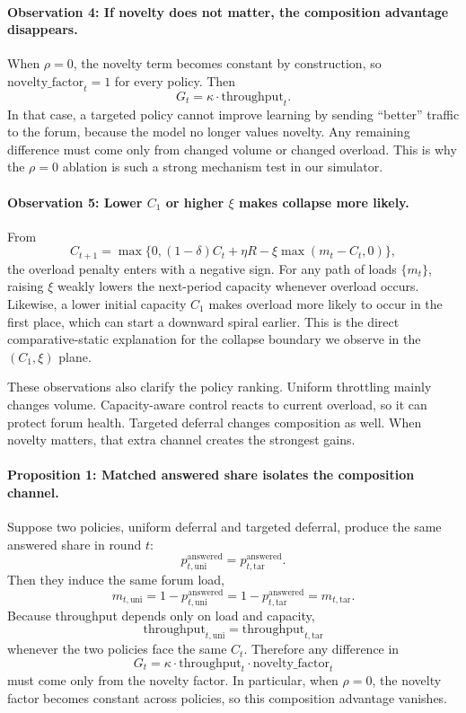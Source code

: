 \documentclass{article}
\begin{document}
\paragraph{Observation 4: If novelty does not matter, the composition advantage disappears.}
When $\rho=0$, the novelty term becomes constant by construction, so $\text{novelty\_factor}_t=1$ for every policy. Then
\[
G_t = \kappa \cdot \text{throughput}_t.
\]
In that case, a targeted policy cannot improve learning by sending ``better'' traffic to the forum, because the model no longer values novelty. Any remaining difference must come only from changed volume or changed overload. This is why the $\rho=0$ ablation is such a strong mechanism test in our simulator.

\paragraph{Observation 5: Lower $C_1$ or higher $\xi$ makes collapse more likely.}
From
\[
C_{t+1} = \max\{0,(1-\delta)C_t + \eta R - \xi \max(m_t-C_t,0)\},
\]
the overload penalty enters with a negative sign. For any path of loads $\{m_t\}$, raising $\xi$ weakly lowers the next-period capacity whenever overload occurs. Likewise, a lower initial capacity $C_1$ makes overload more likely to occur in the first place, which can start a downward spiral earlier. This is the direct comparative-static explanation for the collapse boundary we observe in the $(C_1,\xi)$ plane.

These observations also clarify the policy ranking. Uniform throttling mainly changes volume. Capacity-aware control reacts to current overload, so it can protect forum health. Targeted deferral changes composition as well. When novelty matters, that extra channel creates the strongest gains.

\paragraph{Proposition 1: Matched answered share isolates the composition channel.}
Suppose two policies, uniform deferral and targeted deferral, produce the same answered share in round $t$:
\[
p^{\mathrm{answered}}_{t,\mathrm{uni}} = p^{\mathrm{answered}}_{t,\mathrm{tar}}.
\]
Then they induce the same forum load,
\[
m_{t,\mathrm{uni}} = 1 - p^{\mathrm{answered}}_{t,\mathrm{uni}}
= 1 - p^{\mathrm{answered}}_{t,\mathrm{tar}}
= m_{t,\mathrm{tar}}.
\]
Because throughput depends only on load and capacity,
\[
\mathrm{throughput}_{t,\mathrm{uni}}=\mathrm{throughput}_{t,\mathrm{tar}}
\]
whenever the two policies face the same $C_t$. Therefore any difference in
\[
G_t = \kappa \cdot \mathrm{throughput}_t \cdot \mathrm{novelty\_factor}_t
\]
must come only from the novelty factor. In particular, when $\rho=0$, the novelty factor becomes constant across policies, so this composition advantage vanishes.
\end{document}
